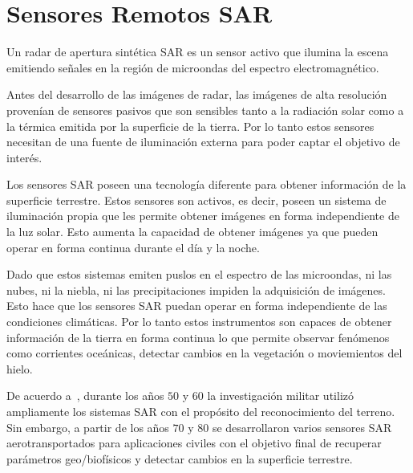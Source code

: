 

\section{Sensores Remotos SAR}


Un radar de apertura sintética SAR es un sensor activo que ilumina la escena emitiendo señales en la región de microondas del espectro electromagnético.

Antes del desarrollo de las imágenes de radar, las imágenes de alta resolución provenían de sensores pasivos que son sensibles tanto a la radiación solar como a la térmica emitida por la superficie de la tierra. Por lo tanto estos sensores necesitan de una fuente de iluminación externa para poder captar el objetivo de interés. 

Los sensores SAR poseen una tecnología diferente para obtener información de la superficie terrestre. Estos sensores son activos, es decir, poseen un sistema de iluminación propia que les permite obtener imágenes en forma independiente de la luz solar. Esto aumenta la capacidad de obtener imágenes ya que pueden operar en forma continua durante el día y la noche.

Dado que estos sistemas emiten puslos en el espectro de las microondas, ni las nubes, ni la niebla, ni las precipitaciones impiden la adquisición de imágenes. Esto hace que los sensores SAR puedan operar en forma independiente de las condiciones climáticas. Por lo tanto estos instrumentos son capaces de obtener información de la tierra en forma continua lo que permite observar fenómenos como corrientes oceánicas, detectar cambios en la vegetación o moviemientos del hielo.


De acuerdo a~\citet{Moreira2013}, durante los años $50$ y $60$ la investigación militar utilizó ampliamente los sistemas SAR con el propósito del reconocimiento del terreno. Sin embargo, a partir de los años $70$ y $80$ se desarrollaron varios sensores SAR aerotransportados  para aplicaciones civiles con el objetivo final de recuperar parámetros geo/biofísicos y detectar cambios en la superficie terrestre.

